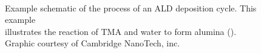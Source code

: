 \begin{figure}[tbp]
{	}  
	\hspace{6pt}	
   \\
	\hspace{6pt} 
   \caption[Illustration of Example ALD Cycle]%
   		{Example schematic of the process of an ALD deposition cycle. This example\\%
		illustrates the reaction of TMA and water to form alumina (). \\%
		{\tiny Graphic courtesy of Cambridge NanoTech, inc.}}
   \label{fig:TMA-illustration}
\end{figure}

